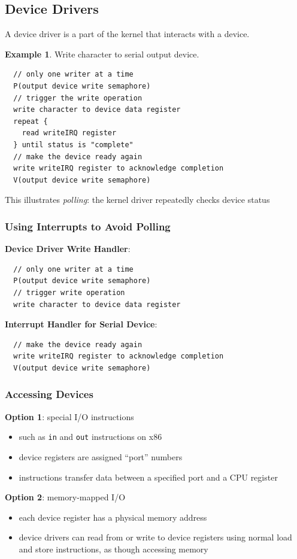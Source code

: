 \documentclass[12pt]{article}
\theoremstyle{plain}
\theoremstyle{definition}
\newtheorem*{ex*}{Example}
\begin{document}
\subsection{Device Drivers}
A device driver is a part of the kernel that interacts with a device.

\begin{ex*}
Write character to serial output device.
\begin{verbatim}
  // only one writer at a time
  P(output device write semaphore)
  // trigger the write operation
  write character to device data register
  repeat {
    read writeIRQ register
  } until status is "complete"
  // make the device ready again
  write writeIRQ register to acknowledge completion
  V(output device write semaphore)
\end{verbatim}
This illustrates \emph{polling}: the kernel driver repeatedly checks device status
\end{ex*}

\subsubsection{Using Interrupts to Avoid Polling}
\textbf{Device Driver Write Handler}:
\begin{verbatim}
  // only one writer at a time
  P(output device write semaphore)
  // trigger write operation
  write character to device data register
\end{verbatim}
\medskip
\textbf{Interrupt Handler for Serial Device}:
\begin{verbatim}
  // make the device ready again
  write writeIRQ register to acknowledge completion
  V(output device write semaphore)
\end{verbatim}

\subsubsection{Accessing Devices}
\textbf{Option 1}: special I/O instructions
\begin{itemize}
  \item such as \texttt{in} and \texttt{out} instructions on x86
  \item device registers are assigned ``port'' numbers
  \item instructions transfer data between a specified port and a CPU register
\end{itemize}
\medskip
\textbf{Option 2}: memory-mapped I/O
\begin{itemize}
  \item each device register has a physical memory address
  \item device drivers can read from or write to device registers using normal load and store instructions, as though accessing memory
\end{itemize}
\end{document}
